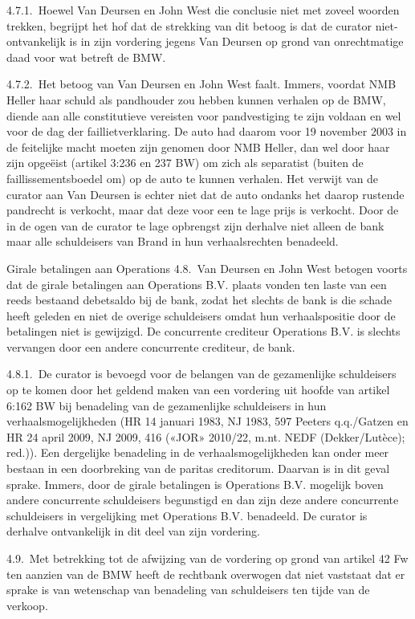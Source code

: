 \documentclass[
  dutch,
  a4paper,
]{article}
\begin{document}
4.7.1. Hoewel Van Deursen en John West die conclusie niet met zoveel woorden trekken, begrijpt het hof dat de strekking van dit betoog is dat de curator niet-ontvankelijk is in zijn vordering jegens Van Deursen op grond van onrechtmatige daad voor wat betreft de BMW.

4.7.2. Het betoog van Van Deursen en John West faalt. Immers, voordat NMB Heller haar schuld als pandhouder zou hebben kunnen verhalen op de BMW, diende aan alle constitutieve vereisten voor pandvestiging te zijn voldaan en wel voor de dag der faillietverklaring. De auto had daarom voor 19 november 2003 in de feitelijke macht moeten zijn genomen door NMB Heller, dan wel door haar zijn opgeëist (artikel 3:236 en 237 BW) om zich als separatist (buiten de faillissementsboedel om) op de auto te kunnen verhalen. Het verwijt van de curator aan Van Deursen is echter niet dat de auto ondanks het daarop rustende pandrecht is verkocht, maar dat deze voor een te lage prijs is verkocht. Door de in de ogen van de curator te lage opbrengst zijn derhalve niet alleen de bank maar alle schuldeisers van Brand in hun verhaalsrechten benadeeld.

Girale betalingen aan Operations
4.8. Van Deursen en John West betogen voorts dat de girale betalingen aan Operations B.V. plaats vonden ten laste van een reeds bestaand debetsaldo bij de bank, zodat het slechts de bank is die schade heeft geleden en niet de overige schuldeisers omdat hun verhaalspositie door de betalingen niet is gewijzigd. De concurrente crediteur Operations B.V. is slechts vervangen door een andere concurrente crediteur, de bank.

4.8.1. De curator is bevoegd voor de belangen van de gezamenlijke schuldeisers op te komen door het geldend maken van een vordering uit hoofde van artikel 6:162 BW bij benadeling van de gezamenlijke schuldeisers in hun verhaalsmogelijkheden (HR 14 januari 1983, NJ 1983, 597 Peeters q.q./Gatzen en HR 24 april 2009, NJ 2009, 416 («JOR» 2010/22, m.nt. NEDF (Dekker/Lutèce); red.)). Een dergelijke benadeling in de verhaalsmogelijkheden kan onder meer bestaan in een doorbreking van de paritas creditorum. Daarvan is in dit geval sprake. Immers, door de girale betalingen is Operations B.V. mogelijk boven andere concurrente schuldeisers begunstigd en dan zijn deze andere concurrente schuldeisers in vergelijking met Operations B.V. benadeeld. De curator is derhalve ontvankelijk in dit deel van zijn vordering.

4.9. Met betrekking tot de afwijzing van de vordering op grond van artikel 42 Fw ten aanzien van de BMW heeft de rechtbank overwogen dat niet vaststaat dat er sprake is van wetenschap van benadeling van schuldeisers ten tijde van de verkoop.
\end{document}
